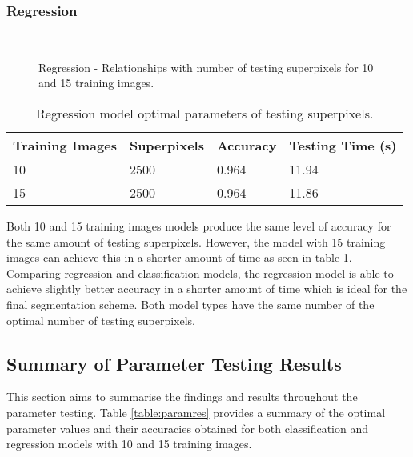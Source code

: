 \subsubsection{Regression}
\begin{figure}[H]
    \centering
    \\
    \caption{Regression - Relationships with number of testing superpixels for 10 and 15 training images.}%
    \label{reg:testpix}
\end{figure}


\begin{table}[H]
\centering
\caption{Regression model optimal parameters of testing superpixels.}

\begin{tabular}{|l|l|l|l|}
\hline
 \textbf{Training Images} &	\textbf{Superpixels} & \textbf{Accuracy} & \textbf{Testing Time (s)}\\
\hline
10 & 2500 & 0.964 & 11.94\\
\hline				    	 			
15 & 2500 & 0.964 & 11.86\\	
\hline		    	 
\end{tabular}
\label{table:regtestpix}
\end{table}

Both 10 and 15 training images models produce the same level of accuracy for the same amount of testing superpixels. However, the model with 15 training images can achieve this in a shorter amount of time as seen in table \ref{table:regtestpix}. 
\\[1\baselineskip]
Comparing regression and classification models, the regression model is able to achieve slightly better accuracy in a shorter amount of time which is ideal for the final segmentation scheme. Both model types have the same number of the optimal number of testing superpixels.

\subsection{Summary of Parameter Testing Results}
This section aims to summarise the findings and results throughout the parameter testing. Table \ref{table:paramres} provides a summary of the optimal parameter values and their accuracies obtained for both classification and regression models with 10 and 15 training images.


